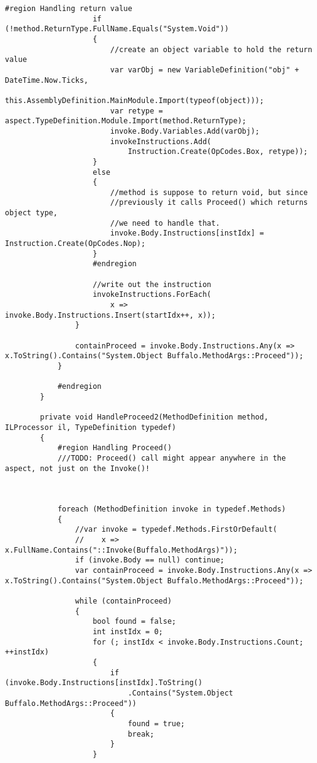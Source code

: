 \begin{lstlisting}[caption={../buffalo/Injectors/MethodAroundInjector.cs}, label=../buffalo/Injectors/MethodAroundInjector.cs, frame=tb, basicstyle=\scriptsize]
                    #region Handling return value
                    if (!method.ReturnType.FullName.Equals("System.Void"))
                    {
                        //create an object variable to hold the return value
                        var varObj = new VariableDefinition("obj" + DateTime.Now.Ticks,
                            this.AssemblyDefinition.MainModule.Import(typeof(object)));
                        var retype = aspect.TypeDefinition.Module.Import(method.ReturnType);
                        invoke.Body.Variables.Add(varObj);
                        invokeInstructions.Add(
                            Instruction.Create(OpCodes.Box, retype));
                    }
                    else
                    {
                        //method is suppose to return void, but since
                        //previously it calls Proceed() which returns object type,
                        //we need to handle that.
                        invoke.Body.Instructions[instIdx] = Instruction.Create(OpCodes.Nop);
                    }
                    #endregion

                    //write out the instruction
                    invokeInstructions.ForEach(
                        x => invoke.Body.Instructions.Insert(startIdx++, x));
                }

                containProceed = invoke.Body.Instructions.Any(x => x.ToString().Contains("System.Object Buffalo.MethodArgs::Proceed"));
            }

            #endregion
        }

        private void HandleProceed2(MethodDefinition method, ILProcessor il, TypeDefinition typedef)
        {
            #region Handling Proceed()
            ///TODO: Proceed() call might appear anywhere in the aspect, not just on the Invoke()!



            foreach (MethodDefinition invoke in typedef.Methods)
            {
                //var invoke = typedef.Methods.FirstOrDefault(
                //    x => x.FullName.Contains("::Invoke(Buffalo.MethodArgs)"));
                if (invoke.Body == null) continue;
                var containProceed = invoke.Body.Instructions.Any(x => x.ToString().Contains("System.Object Buffalo.MethodArgs::Proceed"));

                while (containProceed)
                {
                    bool found = false;
                    int instIdx = 0;
                    for (; instIdx < invoke.Body.Instructions.Count; ++instIdx)
                    {
                        if (invoke.Body.Instructions[instIdx].ToString()
                            .Contains("System.Object Buffalo.MethodArgs::Proceed"))
                        {
                            found = true;
                            break;
                        }
                    }


\end{lstlisting}
